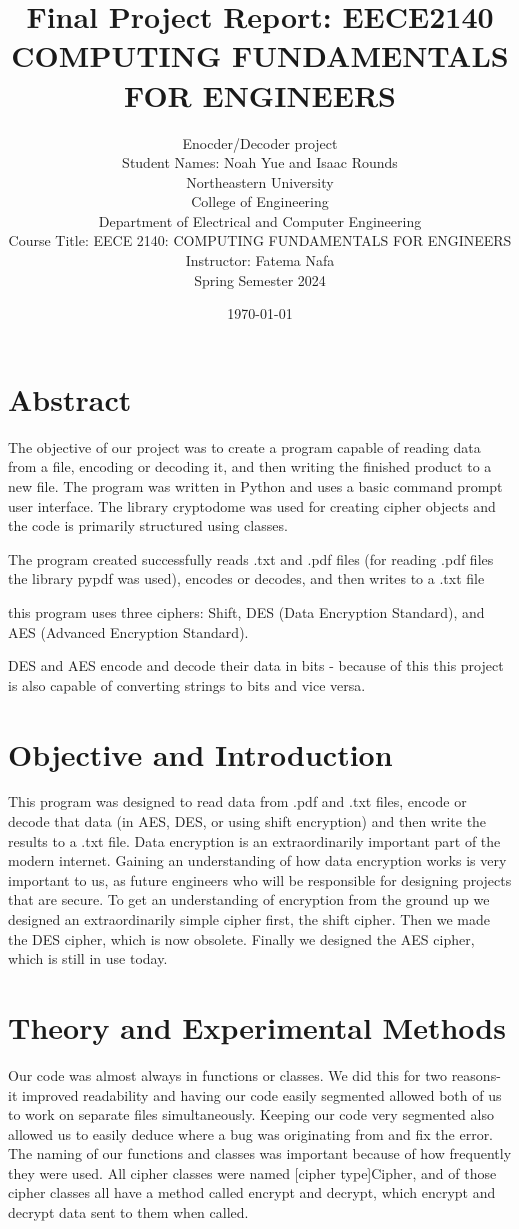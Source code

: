 \documentclass[12pt]{article}
\title{\Large Final Project Report: EECE2140 COMPUTING FUNDAMENTALS FOR ENGINEERS}
\author{
    \normalsize Enocder/Decoder project\\
    \normalsize Student Names: Noah Yue and Isaac Rounds \\
    \normalsize Northeastern University \\
    \normalsize College of Engineering \\
    \normalsize Department of Electrical and Computer Engineering \\
    \normalsize Course Title: EECE 2140: COMPUTING FUNDAMENTALS FOR ENGINEERS \\
    \normalsize Instructor: Fatema Nafa \\
    \normalsize Spring Semester 2024
}
\date{\normalsize\today}
\begin{document}
\maketitle
\newpage


\section{Abstract}
The objective of our project was to create a program capable of reading data from a file, encoding or decoding it, and then writing the finished product to a new file. The program was written in Python and uses a basic command prompt user interface. The library cryptodome was used for creating cipher objects and the code is primarily structured using classes. 

The program created successfully reads .txt and .pdf files (for reading .pdf files the library pypdf was used), encodes or decodes, and then writes to a .txt file

this program uses three ciphers: Shift, DES (Data Encryption Standard), and AES (Advanced Encryption Standard). 

DES and AES encode and decode their data in bits - because of this this project is also capable of converting strings to bits and vice versa.




\section{Objective and Introduction}

This program was designed to read data from .pdf and .txt files, encode or decode that data (in AES, DES, or using shift encryption) and then write the results to a .txt file.
Data encryption is an extraordinarily important part of the modern internet. Gaining an understanding of how data encryption works is very important to us, as future engineers who will be responsible for designing projects that are secure. To get an understanding of encryption from the ground up we designed an extraordinarily simple cipher first, the shift cipher. Then we made the DES cipher, which is now obsolete. Finally we designed the AES cipher, which is still in use today.

\section{Theory and Experimental Methods}

Our code was almost always in functions or classes. We did this for two reasons- it improved readability and having our code easily segmented allowed both of us to work on separate files simultaneously. Keeping our code very segmented also allowed us to easily deduce where a bug was originating from and fix the error. The naming of our functions and classes was important because of how frequently they were used. All cipher classes were named [cipher type]Cipher, and of those cipher classes all have a method called encrypt and decrypt, which encrypt and decrypt data sent to them when called.
\end{document}
